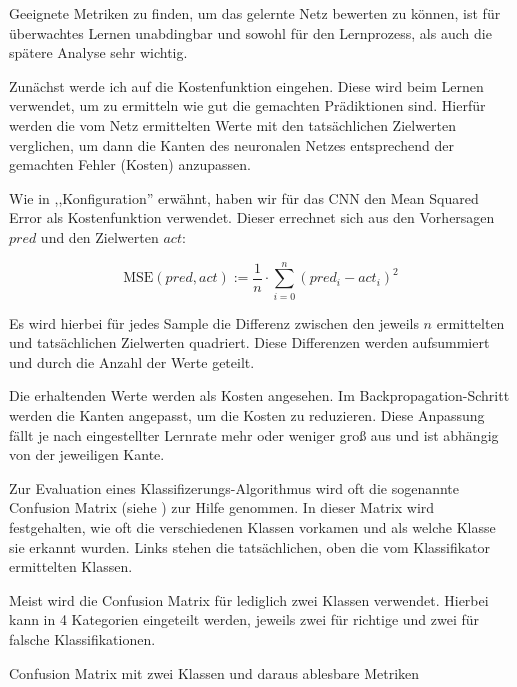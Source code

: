 Geeignete Metriken zu finden, um das gelernte Netz bewerten zu können, ist für überwachtes Lernen unabdingbar und sowohl für den Lernprozess, als auch die spätere Analyse sehr wichtig.

Zunächst werde ich auf die Kostenfunktion eingehen. Diese wird beim Lernen verwendet, um zu ermitteln wie gut die gemachten Prädiktionen sind. Hierfür werden die vom Netz ermittelten Werte mit den tatsächlichen Zielwerten verglichen, um dann die Kanten des neuronalen Netzes entsprechend der gemachten Fehler (Kosten) anzupassen.

Wie in  ,,Konfiguration'' erwähnt, haben wir für das CNN den Mean Squared Error als Kostenfunktion verwendet. Dieser errechnet sich aus den Vorhersagen $pred$ und den Zielwerten $act$:

$$\text{MSE}(pred, act) := \frac{1}{n} \cdot \sum_{i=0}^{n} (pred_i - act_i)^2$$

Es wird hierbei für jedes Sample die Differenz zwischen den jeweils $n$ ermittelten und tatsächlichen Zielwerten quadriert. Diese Differenzen werden aufsummiert und durch die Anzahl der Werte geteilt.

Die erhaltenden Werte werden als Kosten angesehen. Im Backpropagation-Schritt werden die Kanten angepasst, um die Kosten zu reduzieren. Diese Anpassung fällt je nach eingestellter Lernrate mehr oder weniger groß aus und ist abhängig von der jeweiligen Kante.

Zur Evaluation eines Klassifizerungs-Algorithmus wird oft die sogenannte Confusion Matrix (siehe ) zur Hilfe genommen. In dieser Matrix wird festgehalten, wie oft die verschiedenen Klassen vorkamen und als welche Klasse sie erkannt wurden. Links stehen die tatsächlichen, oben die vom Klassifikator ermittelten Klassen.

Meist wird die Confusion Matrix für lediglich zwei Klassen verwendet. Hierbei kann in 4 Kategorien eingeteilt werden, jeweils zwei für richtige und zwei für falsche Klassifikationen.

\begin{table}[htb]
    \centering

    \vspace{2em}


    \caption{Confusion Matrix mit zwei Klassen und daraus ablesbare Metriken}
\end{table}


